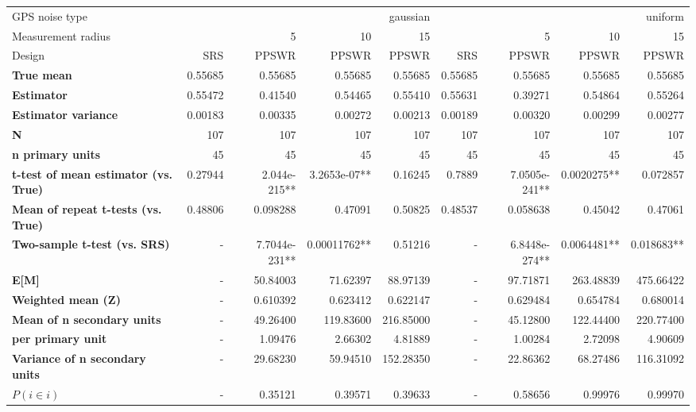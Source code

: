 \begin{tabular}{l|r|rrr|r|rrr}
\toprule
GPS noise type & \multicolumn{4}{r}{gaussian} & \multicolumn{4}{r}{uniform} \\
Measurement radius &  & 5 & 10 & 15 &  & 5 & 10 & 15 \\
Design & SRS & PPSWR & PPSWR & PPSWR & SRS & PPSWR & PPSWR & PPSWR \\
\midrule
\textbf{True mean} &  0.55685 &  0.55685 &  0.55685 &  0.55685 &  0.55685 &  0.55685 &  0.55685 &  0.55685 \\
\textbf{Estimator} & 0.55472 & 0.41540 & 0.54465 & 0.55410 & 0.55631 & 0.39271 & 0.54864 & 0.55264 \\
\textbf{Estimator variance} & 0.00183 & 0.00335 & 0.00272 & 0.00213 & 0.00189 & 0.00320 & 0.00299 & 0.00277 \\
\textbf{N} & 107 & 107 & 107 & 107 & 107 & 107 & 107 & 107 \\
\textbf{n primary units} & 45 & 45 & 45 & 45 & 45 & 45 & 45 & 45 \\
\textbf{t-test of mean estimator (vs. True)} & 0.27944 & 2.044e-215** & 3.2653e-07** & 0.16245 & 0.7889 & 7.0505e-241** & 0.0020275** & 0.072857 \\
\textbf{Mean of repeat t-tests (vs. True)} & 0.48806 & 0.098288 & 0.47091 & 0.50825 & 0.48537 & 0.058638 & 0.45042 & 0.47061 \\
\textbf{Two-sample t-test (vs. SRS)} & - & 7.7044e-231** & 0.00011762** & 0.51216 & - & 6.8448e-274** & 0.0064481** & 0.018683** \\
\textbf{E[M]} & - & 50.84003 & 71.62397 & 88.97139 & - & 97.71871 & 263.48839 & 475.66422 \\
\textbf{Weighted mean (Z)} & - & 0.610392 & 0.623412 & 0.622147 & - & 0.629484 & 0.654784 & 0.680014 \\
\textbf{Mean of n secondary units} & - & 49.26400 & 119.83600 & 216.85000 & - & 45.12800 & 122.44400 & 220.77400 \\
\textbf{     per primary unit} & - & 1.09476 & 2.66302 & 4.81889 & - & 1.00284 & 2.72098 & 4.90609 \\
\textbf{Variance of n secondary units} & - & 29.68230 & 59.94510 & 152.28350 & - & 22.86362 & 68.27486 & 116.31092 \\
\textbf{$P(i \in i)$} & - & 0.35121 & 0.39571 & 0.39633 & - & 0.58656 & 0.99976 & 0.99970 \\
\bottomrule
\end{tabular}

